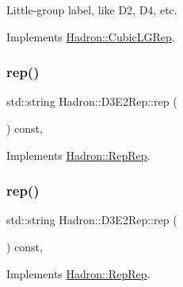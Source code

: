 Little-\/group label, like D2, D4, etc. 

Implements \mbox{\hyperlink{structHadron_1_1CubicLGRep_a9bdb14b519a611d21379ed96a3a9eb41}{Hadron\+::\+Cubic\+L\+G\+Rep}}.

\mbox{\label{structHadron_1_1D3E2Rep_a364e5dfff2bff7d5c2cfce7811e2fe9f}} 
\subsubsection{\texorpdfstring{rep()}{rep()}\hspace{0.1cm}{\footnotesize\ttfamily [1/5]}}
{\footnotesize\ttfamily std\+::string Hadron\+::\+D3\+E2\+Rep\+::rep (\begin{DoxyParamCaption}{ }\end{DoxyParamCaption}) const\hspace{0.3cm}{\ttfamily [inline]}, {\ttfamily [virtual]}}



Implements \mbox{\hyperlink{structHadron_1_1RepRep_ab3213025f6de249f7095892109575fde}{Hadron\+::\+Rep\+Rep}}.

\mbox{\label{structHadron_1_1D3E2Rep_a364e5dfff2bff7d5c2cfce7811e2fe9f}} 
\subsubsection{\texorpdfstring{rep()}{rep()}\hspace{0.1cm}{\footnotesize\ttfamily [2/5]}}
{\footnotesize\ttfamily std\+::string Hadron\+::\+D3\+E2\+Rep\+::rep (\begin{DoxyParamCaption}{ }\end{DoxyParamCaption}) const\hspace{0.3cm}{\ttfamily [inline]}, {\ttfamily [virtual]}}



Implements \mbox{\hyperlink{structHadron_1_1RepRep_ab3213025f6de249f7095892109575fde}{Hadron\+::\+Rep\+Rep}}.

\mbox{\label{structHadron_1_1D3E2Rep_a364e5dfff2bff7d5c2cfce7811e2fe9f}} 
